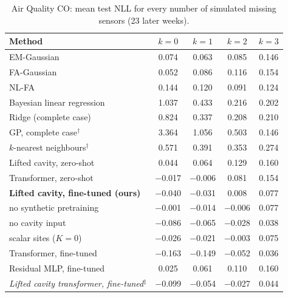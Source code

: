 \begin{table}[h]
\centering\small
\caption{\label{tab:moreairqco}Air Quality CO: mean test NLL for every number of simulated missing sensors (23 later weeks).}
\begin{tabular}{lcccc}
\toprule
Method & $k{=}0$ & $k{=}1$ & $k{=}2$ & $k{=}3$\\
\midrule
EM-Gaussian & 0.074 & 0.063 & 0.085 & 0.146\\
FA-Gaussian & 0.052 & 0.086 & 0.116 & 0.154\\
NL-FA & 0.144 & 0.120 & 0.091 & 0.124\\
Bayesian linear regression & 1.037 & 0.433 & 0.216 & 0.202\\
Ridge (complete case) & 0.824 & 0.337 & 0.208 & 0.210\\
GP, complete case$^\dagger$ & 3.364 & 1.056 & 0.503 & 0.146\\
$k$-nearest neighbours$^\dagger$ & 0.571 & 0.391 & 0.353 & 0.274\\
Lifted cavity, zero-shot & 0.044 & 0.064 & 0.129 & 0.160\\
Transformer, zero-shot & $-$0.017 & $-$0.006 & 0.081 & 0.154\\
\textbf{Lifted cavity, fine-tuned (ours)} & $-$0.040 & $-$0.031 & 0.008 & 0.077\\
\quad no synthetic pretraining & $-$0.001 & $-$0.014 & $-$0.006 & 0.077\\
\quad no cavity input & $-$0.086 & $-$0.065 & $-$0.028 & 0.038\\
\quad scalar sites ($K=0$) & $-$0.026 & $-$0.021 & $-$0.003 & 0.075\\
Transformer, fine-tuned & $-$0.163 & $-$0.149 & $-$0.052 & 0.036\\
Residual MLP, fine-tuned & 0.025 & 0.061 & 0.110 & 0.160\\
\emph{Lifted cavity transformer, fine-tuned}$^\ddagger$ & $-$0.099 & $-$0.054 & $-$0.027 & 0.044\\
\bottomrule
\end{tabular}
\end{table}

